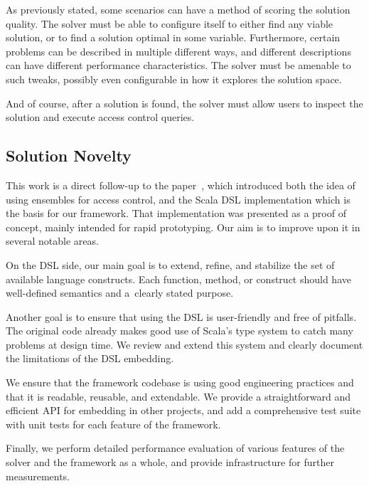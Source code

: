 As previously stated, some scenarios can have a method of scoring the solution quality.
The solver must be able to configure itself to either find any viable solution, or to
find a solution optimal in some variable. Furthermore, certain problems can be described
in multiple different ways, and different descriptions can have different performance
characteristics. The solver must be amenable to such tweaks, possibly even configurable
in how it explores the solution space.

And of course, after a solution is found, the solver must allow users to inspect the
solution and execute access control queries.

\subsection{Solution Novelty}

This work is a direct follow-up to the paper~\citep{isola2018}, which introduced both
the idea of using ensembles for access control, and the Scala DSL implementation which
is the basis for our framework. That implementation was presented as a proof of concept,
mainly intended for rapid prototyping. Our aim is to improve upon it in several notable
areas.

On the DSL side, our main goal is to extend, refine, and stabilize the set of available
language constructs. Each function, method, or construct should have well-defined
semantics and a~clearly stated purpose.

Another goal is to ensure that using the DSL is user-friendly and free of pitfalls. The
original code already makes good use of Scala's type system to catch many problems at
design time. We review and extend this system and clearly document the limitations of
the DSL embedding.

We ensure that the framework codebase is using good engineering practices and that it
is readable, reusable, and extendable. We provide a straightforward and efficient API
for embedding in other projects, and add a comprehensive test suite with unit tests for
each feature of the framework.

Finally, we perform detailed performance evaluation of various features of the solver
and the framework as a whole, and provide infrastructure for further measurements.
